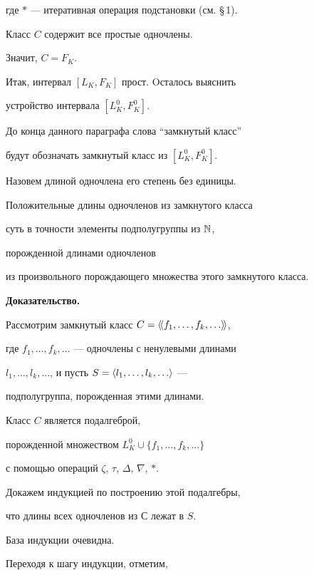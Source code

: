 где $*$ --- итеративная операция подстановки (см. {\S\,1}). 


Класс $C$ содержит все простые одночлены.


Значит, $C=F_K$.





Итак, интервал $[L_K,F_K]$ прост. Oсталось выяснить


устройство интервала $[L^0_K,F^0_K]$.


До конца данного параграфа слова ``замкнутый класс'' 


будут обозначать замкнутый класс из $[L^0_K,F^0_K]$.





Назовем длиной одночлена его степень без единицы.





\begin{lem}


Положительные длины одночленов из замкнутого класса


суть в точности элементы подполугруппы из $\Bbb N$,


порожденной длинами одночленов 


из произвольного порождающего множества этого замкнутого класса.


\end{lem}





{\bf Доказательство.}


Рассмотрим замкнутый класс $C={{\langle {\!{\langle { {f_1},\dotsc,{f_k},\dotsc}\rangle}\!}\rangle}}$,


где $f_1,\dotsc,f_k,\dotsc$ --- одночлены с ненулевыми длинами


$l_1,\dotsc,l_k,\dotsc$, и пусть $S={\langle {l_1,\dotsc,l_k,\dotsc}\rangle}$ ---


подполугруппа, порожденная этими длинами.


Класс $C$ является подалгеброй, 


порожденной множеством $L^0_K\cup\{f_1,\dotsc,f_k,\dotsc \}$


с помощью операций $\zeta$, $\tau$, $\Delta$, $\nabla$, $*$.


Докажем индукцией по построению этой подалгебры,


что длины всех одночленов из $С$ лежат в $S$.


База индукции очевидна.


Переходя к шагу индукции, отметим,


